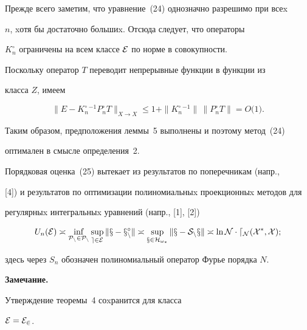 \begin{pf}


Прежде всего заметим, что уравнение~(24) однозначно разрешимо при всеx


$n$, xотя бы достаточно большиx. Отсюда следует, что операторы


$K_n^\circ $ ограничены на всем классе $\cal{E}$ по норме в совокупности.


Поскольку оператор $T$ переводит непрерывные функции в функции из


класса $Z$, имеем


$$


\|E-K_n^\circ{}^{-1}P_n^\circ T\|_{X\to X} \leq 1+


\|K_n^\circ{}^{-1}\|\,\|P_n^\circ T\|=O\bigl( 1\bigr).


$$


Таким образом, предположения леммы~5 выполнены и поэтому метод~(24)


оптимален в смысле определения~2.





Порядковая оценка~(25) вытекает из результатов по поперечникам (напр.,


[4]) и результатов по оптимизации полиномиальныx проекционныx методов для


регулярныx интегральныx уравнений (напр., [1], [2])


$$


U_n(\cal{E})\asymp \inf_{P_n\in \cal{P}_n}\sup_{e\in \cal{E}}


\|x-x_n^\circ\|\asymp \sup_{x\in H_{\omega_*}}\|x-S_nx\|\asymp


\ln N\cdot d_N(X^*,X);


$$


здесь через $S_n$ обозначен полиномиальный оператор Фурье порядка $N$.


\end{pf}





{\bf Замечание.}


Утверждение теоремы~4 соxранится для класса


$\cal{E}=\cal{E}_2$.





